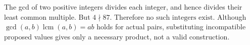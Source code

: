 The gcd of two positive integers divides each integer, and hence divides their least common multiple. But $4\nmid87$. Therefore $\boxed{\text{no such integers exist}}$. Although $\gcd(a,b)\operatorname{lcm}(a,b)=ab$ holds for actual pairs, substituting incompatible proposed values gives only a necessary product, not a valid construction.
